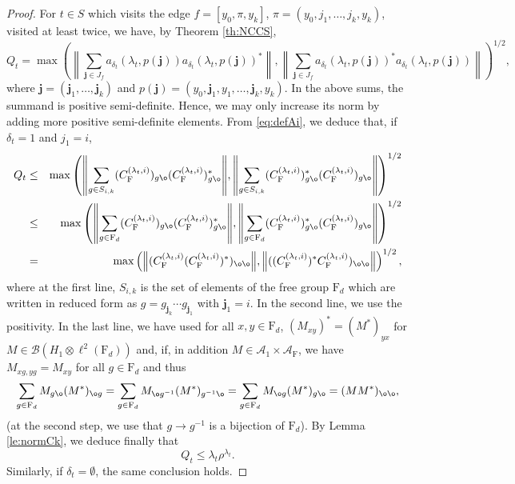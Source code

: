 \documentclass[11pt]{article}
\renewcommand{\star}{{\mathrm{F}}}
\newcommand{\cA}{\mathcal{A}}
\newcommand{\dF}{\mathrm{F}}
\newcommand{\cB}{\mathcal{B}}
\newcommand{\NRM}[1]{{{\left\| #1\right\|}}} %
\newcommand{\1}{1\!\!{\sf I}}
\begin{document}
\begin{proof}
For $t \in S$ which visits the edge $f = [y_0,\pi,y_k]$, $\pi = (y_0,j_1,\ldots,j_k,y_k)$, visited at least twice, we have, by Theorem \ref{th:NCCS},
$$
Q_t = \max \left( \NRM{ \sum_{\bm{j} \in J_f}  a_{\delta_t} (\lambda_t , p(\bm j)) a_{\delta_t} (\lambda_t , p(\bm j))^*}, \NRM{\sum_{\bm j \in J_f} a_{\delta_t} (\lambda_t , p(\bm j))^* a_{\delta_t} (\lambda_t , p(\bm j))} \right)^{1/2},
$$
where $\bm j = (\bm j_1, \ldots, \bm j_k)$ and $p(\bm j) = (y_0,\bm j_1, y_1,\ldots, \bm j_k,y_k)$. In the above sums, the summand is positive semi-definite. Hence, we may only increase its norm by adding more positive semi-definite elements. From \eqref{eq:defAi}, we deduce that, if $\delta_t = 1$ and $j_1 = i$, 
\begin{eqnarray*}\label{eq:Qta}
Q_{t}  & \leq & \max \left( \NRM{ \sum_{ g  \in S_{i,k} } (C^{(\lambda_t,i)}_\star) _{ g \o }     (C^{(\lambda_t,i)}_\star)^* _{ g \o } }  ,  \NRM{ \sum_{ g  \in S_{i,k} }    (C^{(\lambda_t,i)}_\star)^* _{ g \o }    (C^{(\lambda_t,i)}_\star) _{ g \o }  }   \right)^{1/2}\\
& \leq & \max \left( \NRM{ \sum_{ g  \in \dF_d } (C^{(\lambda_t,i)}_\star) _{ g \o }     (C^{(\lambda_t,i)}_\star)^* _{ g \o } }  ,  \NRM{ \sum_{ g  \in \dF_d }    (C^{(\lambda_t,i)}_\star)^* _{ g \o }    (C^{(\lambda_t,i)}_\star) _{ g \o }  }   \right)^{1/2}\\
& =  & \max \left( \NRM{  (C^{(\lambda_t,i)}_\star (C^{(\lambda_t,i)}_\star)^*)  _{ \o \o }   }  ,  \NRM{ ((C^{(\lambda_t,i)}_\star)^* C^{(\lambda_t,i)}_\star )  _{ \o \o }  }   \right)^{1/2} ,
\end{eqnarray*}
where at the first line, $S_{i,k}$ is the set of elements of the free group $\dF_d$ which are written in reduced form as $g = g_{\bm j_k}\cdots g_{\bm j_1}$ with $\bm j_1 = i$. In the second line, we use the positivity. In the last line, we have used for all $x,y \in \dF_d$, $(M_{xy})^* = (M^*)_{yx}$ for $M \in \cB(H_1 \otimes \ell^2 (\dF_d))$ and, if, in addition $M \in \cA_1 \times \cA_\star$, we have $M_{xg,yg} = M_{xy}$ for all $g \in \dF_d$ and thus
$$
\sum_{g \in \dF_d} M_{g \o} (M^*)_{\o g} = \sum_{g \in \dF_d} M_{\o g^{-1}} (M^*)_{g^{-1} \o} = \sum_{g \in \dF_d} M_{\o g} (M^*)_{g \o}  = (M M ^*)_{\o \o},
$$
(at the second step, we use that $g \to g^{-1}$ is a bijection of $\dF_d$).  By Lemma \ref{le:normCk}, we deduce finally that 
$$
Q_t \leq \lambda_t \rho^{\lambda_t}.
$$
Similarly, if $\delta_t = \emptyset$, the same conclusion holds. 


\end{proof}
\end{document}
